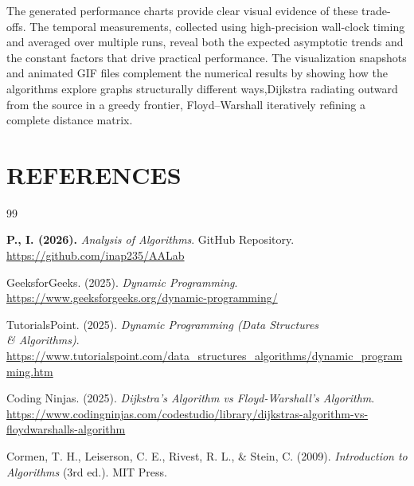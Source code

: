\documentclass[12pt]{article}
\begin{document}
The generated performance charts provide clear visual evidence of these trade-offs. The temporal measurements, collected
using high-precision wall-clock timing and averaged over multiple runs, reveal both the expected asymptotic trends and
the constant factors that drive practical performance. The visualization snapshots and animated GIF files complement
the numerical results by showing how the algorithms explore graphs structurally different ways,Dijkstra radiating outward
from the source in a greedy frontier, Floyd--Warshall iteratively refining a complete distance matrix.


\newpage
{}
\section*{REFERENCES}
\vspace{-2.5em}
\renewcommand{\refname}{}
\begin{thebibliography}{99}

\textbf{P., I. (2026).} \textit{Analysis of Algorithms}. GitHub Repository.
\url{https://github.com/inap235/AALab}

GeeksforGeeks. (2025). \textit{Dynamic Programming}.
\url{https://www.geeksforgeeks.org/dynamic-programming/}

TutorialsPoint. (2025). \textit{Dynamic Programming (Data Structures \\& Algorithms)}.
\url{https://www.tutorialspoint.com/data_structures_algorithms/dynamic_programming.htm}

Coding Ninjas. (2025). \textit{Dijkstra's Algorithm vs Floyd-Warshall's Algorithm}.
\url{https://www.codingninjas.com/codestudio/library/dijkstras-algorithm-vs-floydwarshalls-algorithm}

Cormen, T. H., Leiserson, C. E., Rivest, R. L., \& Stein, C. (2009).
\textit{Introduction to Algorithms} (3rd ed.). MIT Press.

\end{thebibliography}
\pagebreak
\end{document}
